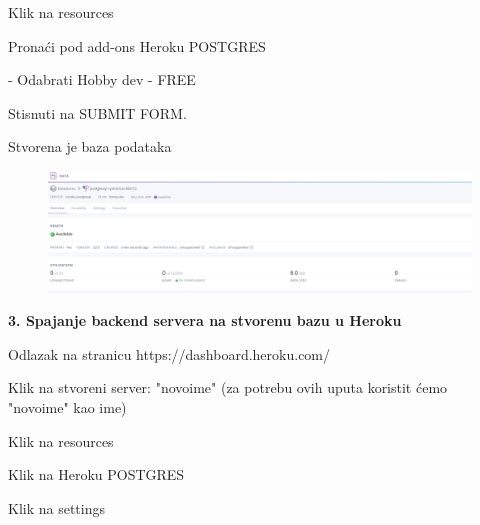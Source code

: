 \begin{packed_item}
\begin{packed_enum}
							\item Klik na resources
							
							\item Pronaći pod add-ons  Heroku POSTGRES
							
							    - Odabrati Hobby dev - FREE
							  
							
							\item Stisnuti na SUBMIT FORM.
							
							\item Stvorena je baza podataka
							    
							    \begin{figure}[H]
                        			\hspace*{-1.5cm}
                        			\includegraphics[scale=0.3]{dijagrami/baza.PNG} %
                        			\centering
                        			\label{fig:promjene}
                        		\end{figure}

						\end{packed_enum}
						
						
						\item  \textbf{3. Spajanje backend servera na stvorenu bazu u Heroku}
						\item[] \begin{packed_enum}
	
							\item Odlazak na stranicu  https://dashboard.heroku.com/
							
							\item Klik na stvoreni server: "novoime" (za potrebu ovih uputa koristit ćemo "novoime" kao ime)
							
							\item Klik na resources
							
							\item Klik na Heroku POSTGRES
							
							\item Klik na settings
							

\end{packed_enum}
\end{packed_item}
